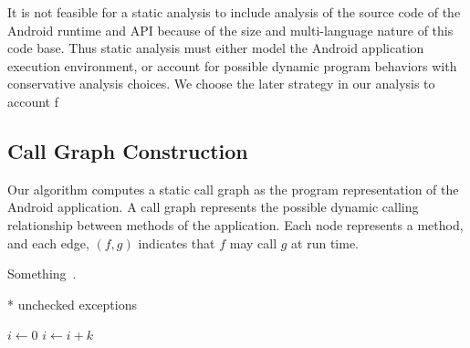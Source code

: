 It is not feasible for a static analysis to include analysis of the
source code of the Android runtime and API because of the size and
multi-language nature of this code base.  Thus static analysis must
either model the Android application execution environment, or account
for possible dynamic program behaviors with conservative analysis
choices.  We choose the later strategy in our analysis to account f

\subsection{Call Graph Construction}

Our algorithm computes a static call graph as the program
representation of the Android application.  A call graph represents
the possible dynamic calling relationship between methods of the
application.  Each node represents a method, and each edge, $(f,g)$
indicates that $f$ may call $g$ at run time.  

Something~\cite{Fu2007}.

* unchecked exceptions





\begin{algorithmic}[1]
    \State $i\gets 0$
\Else
        \State $i\gets i+k$
    \EndIf
\EndIf
\end{algorithmic}

